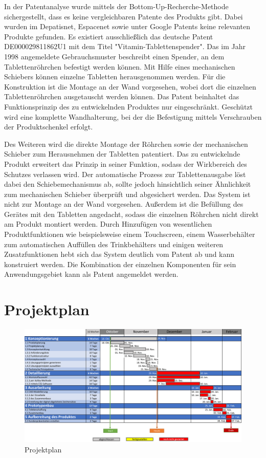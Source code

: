 In der Patentanalyse wurde mittels der Bottom-Up-Recherche-Methode sichergestellt, dass es keine vergleichbaren Patente des Produkts gibt. Dabei wurden im Depatisnet, Espacenet sowie unter Google Patents keine relevanten Produkte gefunden. Es existiert ausschließlich das deutsche Patent DE000029811862U1 mit dem Titel "Vitamin-Tablettenspender". Das im Jahr 1998 angemeldete Gebrauchsmuster beschreibt einen Spender, an dem Tablettenröhrchen befestigt werden können. Mit Hilfe eines mechanischen Schiebers können einzelne Tabletten herausgenommen werden. Für die Konstruktion ist die Montage an der Wand vorgesehen, wobei dort die einzelnen Tablettenröhrchen ausgetauscht werden können. Das Patent beinhaltet das Funktionsprinzip des zu entwickelnden Produktes nur eingeschränkt. Geschützt wird eine komplette Wandhalterung, bei der die Befestigung mittels Verschrauben der Produktschenkel erfolgt.

Des Weiteren wird die direkte Montage der Röhrchen sowie der mechanischen Schieber zum Herausnehmen der Tabletten patentiert. Das zu entwickelnde Produkt erweitert das Prinzip in seiner Funktion, sodass der Wirkbereich des Schutzes verlassen wird. Der automatische Prozess zur Tablettenausgabe löst dabei den Schiebemechanismus ab, sollte jedoch hinsichtlich seiner Ähnlichkeit zum mechanischen Schieber überprüft und abgesichert werden. Das System ist nicht zur Montage an der Wand vorgesehen. Außerdem ist die Befüllung des Gerätes mit den Tabletten angedacht, sodass die einzelnen Röhrchen nicht direkt am Produkt montiert werden. Durch Hinzufügen von wesentlichen Produktfunktionen wie beispielsweise einem Touchscreen, einem Wasserbehälter zum automatischen Auffüllen des Trinkbehälters und einigen weiteren Zusatzfunktionen hebt sich das System deutlich vom Patent ab und kann konstruiert werden. Die Kombination der einzelnen Komponenten für sein Anwendungsgebiet kann als Patent angemeldet werden.

\section{Projektplan}
\begin{figure}[H]
	\centering
	\includegraphics[angle=90, height=0.9\textheight]{chapter/Bilder/ganttplan} 
	\caption{Projektplan}
\end{figure}

